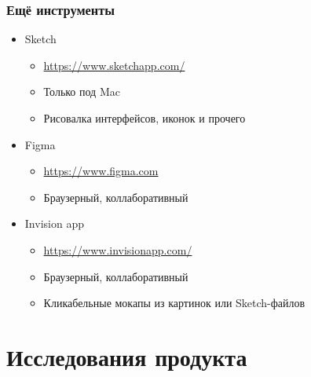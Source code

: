 \documentclass{../../slides-style}
\begin{document}
    \begin{frame}
        \frametitle{Ещё инструменты}
        \begin{itemize}
            \item Sketch
            \begin{itemize}
                \item \url{https://www.sketchapp.com/}
                \item Только под Mac
                \item Рисовалка интерфейсов, иконок и прочего
            \end{itemize}
            \item Figma
            \begin{itemize}
                \item \url{https://www.figma.com}
                \item Браузерный, коллаборативный
            \end{itemize}
            \item Invision app
            \begin{itemize}
                \item \url{https://www.invisionapp.com/}
                \item Браузерный, коллаборативный
                \item Кликабельные мокапы из картинок или Sketch-файлов
            \end{itemize}
        \end{itemize}
    \end{frame}

    \section{Исследования продукта}
\end{document}
